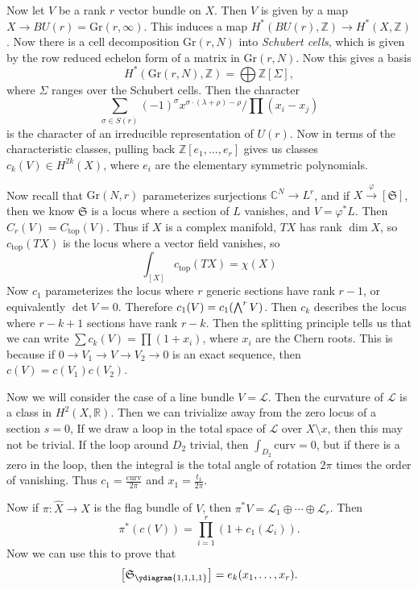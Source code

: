 \documentclass[leqno, openany]{memoir}
\theoremstyle{definition}
\theoremstyle{remark}
\theoremstyle{plain}
\theoremstyle{definition}
\theoremstyle{remark}
\newcommand{\R}{\mathbb{R}}
\newcommand{\C}{\mathbb{C}}
\newcommand{\Z}{\mathbb{Z}}
\newcommand{\mc}[1]{\mathcal{#1}}
\newcommand{\mf}[1]{\mathfrak{#1}}
\newcommand{\mr}[1]{\mathrm{#1}}
\newcommand{\wh}[1]{\widehat{#1}}
\begin{document}
Now let $V$ be a rank $r$ vector bundle on $X$. Then $V$ is given by a map $X \to BU(r) = \mr{Gr}(r, \infty)$. This induces a map $H^*(BU(r), \Z) \to H^*(X, \Z)$. Now there is a cell decomposition $\mr{Gr}(r, N)$ into \textit{Schubert cells}, which is given by the row reduced echelon form of a matrix in $\mr{Gr}(r, N)$. Now this gives a basis
\[ H^*(\mr{Gr}(r, N), \Z) = \bigoplus \Z[\Sigma], \]
where $\Sigma$ ranges over the Schubert cells. Then the character
\[ \sum_{\sigma \in S(r)} {(-1)}^{\sigma} x^{\sigma \cdot (\lambda + \rho) - \rho} / \prod (x_i - x_j) \]
is the character of an irreducible representation of $U(r)$. Now in terms of the characteristic classes, pulling back $\Z[e_1, \ldots, e_r]$ gives us classes $c_k(V) \in H^{2k}(X)$, where $e_i$ are the elementary symmetric polynomials.

Now recall that $\mr{Gr}(N, r)$ parameterizes surjections $\C^N \to L^r$, and if $X \xrightarrow{\varphi} [\mathfrak{S}]$, then we know $\mf{S}$ is a locus where a section of $L$ vanishes, and $V = \varphi^* L$. Then $C_r(V) = C_{\mr{top}}(V)$. Thus if $X$ is a complex manifold, $TX$ has rank $\dim X$, so $c_{\mr{top}}(TX)$ is the locus where a vector field vanishes, so
\[ \int_{[X]} c_{\mr{top}}(TX) = \chi(X) \]
Now $c_1$ parameterizes the locus where $r$ generic sections have rank $r-1$, or equivalently $\det V = 0$. Therefore $c_1(V) = c_1 \qty(\bigwedge^r V)$. Then $c_k$ describes the locus where $r-k+1$ sections have rank $r-k$. Then the splitting principle tells us that we can write $\sum c_k(V) = \prod (1 + x_i)$, where $x_i$ are the Chern roots. This is because if $0 \to V_1 \to V \to V_2 \to 0$ is an exact sequence, then $c(V) = c(V_1) c(V_2)$.

Now we will consider the case of a line bundle $V = \mc{L}$. Then the curvature of $\mc{L}$ is a class in $H^2(X, \R)$. Then we can trivialize away from the zero locus of a section $s = 0$, If we draw a loop in the total space of $\mc{L}$ over $X \setminus x$, then this may not be trivial. If the loop around $D_2$ trivial, then $\int_{D_2} \mr{curv} = 0$, but if there is a zero in the loop, then the integral is the total angle of rotation $2 \pi$ times the order of vanishing. Thus $c_1 = \frac{\mr{curv}}{2\pi}$ and $x_1 = \frac{t_1}{2\pi}$.

Now if $\pi \colon \wh{X} \to X$ is the flag bundle of $V$, then $\pi^* V = \mc{L}_1 \oplus \cdots \oplus \mc{L}_r$. Then 
\[ \pi^*(c(V)) = \prod_{i=1}^r (1 + c_1(\mc{L}_i)). \]
Now we can use this to prove that 
\[ \qty[\mf{S}_{\tiny\ydiagram{1,1,1,1}}] = e_k(x_1, \ldots, x_r). \]
\end{document}
